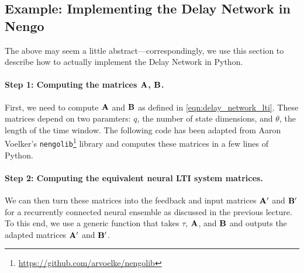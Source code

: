 \documentclass[10pt,letterpaper,oneside]{article}
\begin{document}
\subsection{Example: Implementing the Delay Network in Nengo}

The above may seem a little abstract---correspondingly, we use this section to describe how to actually implement the Delay Network in Python.

\paragraph{Step 1: Computing the matrices ${\mathbf{A}}$, ${\mathbf{B}}$.}
First, we need to compute ${\mathbf{A}}$ and ${\mathbf{B}}$ as defined in \cref{eqn:delay_network_lti}. These matrices depend on two paramters: $q$, the number of state dimensions, and $\theta$, the length of the time window. The following code has been adapted from Aaron Voelker's \texttt{nengolib}\footnote{\url{https://github.com/arvoelke/nengolib}} library and computes these matrices in a few lines of Python.
\cprotect{}

\paragraph{Step 2: Computing the equivalent neural LTI system matrices.}
We can then turn these matrices into the feedback and input matrices ${\mathbf{A}}'$ and ${\mathbf{B}}'$ for a recurrently connected neural ensemble as discussed in the previous lecture. To this end, we use a generic function that takes $\tau$, ${\mathbf{A}}$, and ${\mathbf{B}}$ and outputs the adapted matrices ${\mathbf{A}}'$ and ${\mathbf{B}}'$.
\cprotect{}
\end{document}
